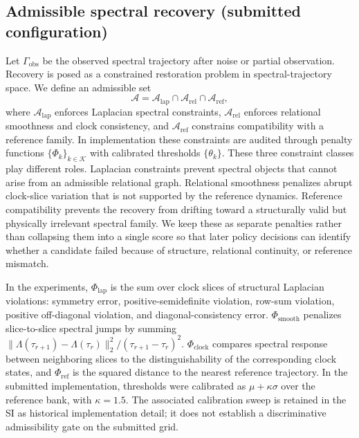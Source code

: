 \documentclass{iopjournal}
\begin{document}
\subsection{Admissible spectral recovery (submitted configuration)}
\label{subsec:admissible-recovery}

Let $\Gamma_{\mathrm{obs}}$ be the observed spectral trajectory after noise or
partial observation. Recovery is posed as a constrained restoration problem in
spectral-trajectory space. We define an admissible set
\begin{equation}
\mathcal{A}
=
\mathcal{A}_{\mathrm{lap}}
\cap
\mathcal{A}_{\mathrm{rel}}
\cap
\mathcal{A}_{\mathrm{ref}},
\end{equation}
where $\mathcal{A}_{\mathrm{lap}}$ enforces Laplacian spectral constraints,
$\mathcal{A}_{\mathrm{rel}}$ enforces relational smoothness and clock consistency,
and $\mathcal{A}_{\mathrm{ref}}$ constrains compatibility with a reference family.
In implementation these constraints are audited through penalty functions
$\{\Phi_k\}_{k\in\mathcal{K}}$ with calibrated thresholds $\{\theta_k\}$.
These three constraint classes play different roles. Laplacian constraints prevent
spectral objects that cannot arise from an admissible relational graph. Relational
smoothness penalizes abrupt clock-slice variation that is not supported by the
reference dynamics. Reference compatibility prevents the recovery from drifting
toward a structurally valid but physically irrelevant spectral family. We keep
these as separate penalties rather than collapsing them into a single score so
that later policy decisions can identify whether a candidate failed because of
structure, relational continuity, or reference mismatch.

In the experiments, $\Phi_{\mathrm{lap}}$ is the sum over clock slices of
structural Laplacian violations: symmetry error, positive-semidefinite violation,
row-sum violation, positive off-diagonal violation, and diagonal-consistency
error. $\Phi_{\mathrm{smooth}}$ penalizes slice-to-slice spectral jumps by summing
$\|\Lambda(\tau_{r+1})-\Lambda(\tau_r)\|_2^2/(\tau_{r+1}-\tau_r)^2$.
$\Phi_{\mathrm{clock}}$ compares spectral response between neighboring slices to
the distinguishability of the corresponding clock states, and
$\Phi_{\mathrm{ref}}$ is the squared distance to the nearest reference trajectory.
In the submitted implementation, thresholds were calibrated as
$\mu+\kappa\sigma$ over the reference bank, with $\kappa=1.5$. The associated
calibration sweep is retained in the SI as historical implementation detail; it
does not establish a discriminative admissibility gate on the submitted grid.
\end{document}
